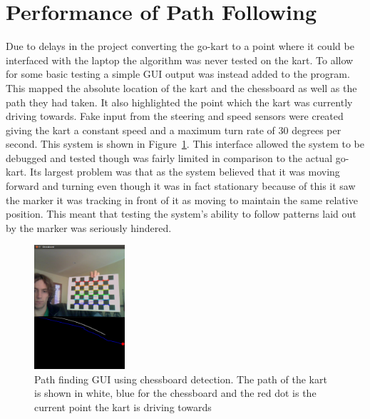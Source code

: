 \section{Performance of Path Following}

Due to delays in the project converting the go-kart to a point where it could be interfaced with the laptop the algorithm was never tested on the kart. To allow for some basic testing a simple GUI output was instead added to the program. This mapped the absolute location of the kart and the chessboard as well as the path they had taken. It also highlighted the point which the kart was currently driving towards. Fake input from the steering and speed sensors were created giving the kart a constant speed and a maximum turn rate of 30 degrees per second. This system is shown in Figure~\ref{tracking}. This interface allowed the system to be debugged and tested though was fairly limited in comparison to the actual go-kart. Its largest problem was that as the system believed that it was moving forward and turning even though it was in fact stationary because of this it saw the marker it was tracking in front of it as moving to maintain the same relative position. This meant that testing the system's ability to follow patterns laid out by the marker was seriously hindered.

\begin{figure}[ht]
	\begin{center}
		\includegraphics[width=0.3\textwidth]{tracking}
	\end{center}
	\caption{Path finding GUI using chessboard detection. The path of the kart is shown in white, blue for the chessboard and the red dot is the current point the kart is driving towards}
	\label{tracking}
\end{figure}